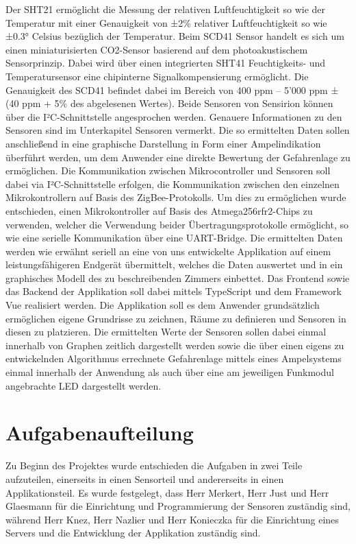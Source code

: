 \documentclass[]{article}
\begin{document}
	Der SHT21 ermöglicht die Messung der relativen Luftfeuchtigkeit so wie der Temperatur mit einer Genauigkeit von ±2\% relativer Luftfeuchtigkeit so wie ±0.3° Celsius bezüglich der Temperatur.\newline
	Beim SCD41 Sensor handelt es sich um einen miniaturisierten CO2-Sensor basierend auf dem photoakustischem Sensorprinzip. Dabei wird über einen integrierten SHT41 Feuchtigkeits- und Temperatursensor eine chipinterne Signalkompensierung ermöglicht. Die Genauigkeit des SCD41 befindet dabei im Bereich von 400 ppm – 5’000 ppm ± (40 ppm + 5\% des abgelesenen Wertes). Beide Sensoren von Sensirion können über die I²C-Schnittstelle angesprochen werden. Genauere Informationen zu den Sensoren sind im Unterkapitel Sensoren vermerkt.\newline
	Die so ermittelten Daten sollen anschließend in eine graphische Darstellung in Form einer Ampelindikation überführt werden, um dem Anwender eine direkte Bewertung der Gefahrenlage zu ermöglichen. Die Kommunikation zwischen Mikrocontroller und Sensoren soll dabei via I²C-Schnittstelle erfolgen, die Kommunikation zwischen den einzelnen Mikrokontrollern auf Basis des ZigBee-Protokolls. Um dies zu ermöglichen wurde entschieden, einen Mikrokontroller auf Basis des Atmega256rfr2-Chips zu verwenden, welcher die Verwendung beider Übertragungsprotokolle ermöglicht, so wie eine serielle Kommunikation über eine UART-Bridge. Die ermittelten Daten werden wie erwähnt seriell an eine von uns entwickelte Applikation auf einem leistungsfähigeren Endgerät übermittelt, welches die Daten auswertet und in ein graphisches Modell des zu beschreibenden Zimmers einbettet. Das Frontend sowie das Backend der Applikation soll dabei mittels TypeScript und dem Framework Vue realisiert werden. Die Applikation soll es dem Anwender grundsätzlich ermöglichen eigene Grundrisse zu zeichnen, Räume zu definieren und Sensoren in diesen zu platzieren. Die ermittelten Werte der Sensoren sollen dabei einmal innerhalb von Graphen zeitlich dargestellt werden sowie die über einen eigens zu entwickelnden Algorithmus errechnete Gefahrenlage mittels eines Ampelsystems einmal innerhalb der Anwendung als auch über eine am jeweiligen Funkmodul angebrachte LED dargestellt werden. 
	
	\section{Aufgabenaufteilung} %
	Zu Beginn des Projektes wurde entschieden die Aufgaben in zwei Teile aufzuteilen, einerseits in einen Sensorteil und andererseits in einen Applikationsteil. Es wurde festgelegt, dass Herr Merkert, Herr Just und Herr Glaesmann für die Einrichtung und Programmierung der Sensoren zuständig sind, während Herr Knez, Herr Nazlier und Herr Konieczka für die Einrichtung eines Servers und die Entwicklung der Applikation zuständig sind. 
\end{document}
